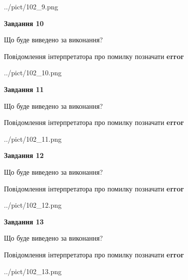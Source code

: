 \documentclass[11pt, ukrainian]{article}
\begin{document}
{\begin {large}
\begin{center}
	{../pict/102_9.png}
\end{center}
\newpage

{\begin {center}\textbf{Завдання 10}\end {center}}\par
Що буде виведено за виконання? \par
Повідомлення інтерпретатора про помилку позначати \textbf{error}

\begin{center}
	{../pict/102_10.png}
\end{center}
\newpage

{\begin {center}\textbf{Завдання 11}\end {center}}\par
Що буде виведено за виконання? \par
Повідомлення інтерпретатора про помилку позначати \textbf{error}

\begin{center}
	{../pict/102_11.png}
\end{center}
\newpage

{\begin {center}\textbf{Завдання 12}\end {center}}\par
Що буде виведено за виконання? \par
Повідомлення інтерпретатора про помилку позначати \textbf{error}

\begin{center}
	{../pict/102_12.png}
\end{center}
\newpage

{\begin {center}\textbf{Завдання 13}\end {center}}\par
Що буде виведено за виконання? \par
Повідомлення інтерпретатора про помилку позначати \textbf{error}

\begin{center}
	{../pict/102_13.png}
\end{center}
\newpage


\end{large}}
\end{document}
